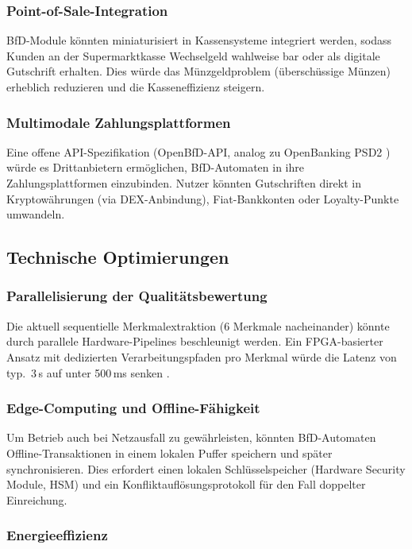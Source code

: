 ﻿\documentclass[a4paper,12pt]{article}
\theoremstyle{definition}
\begin{document}
\subsubsection{Point-of-Sale-Integration}

BfD-Module könnten miniaturisiert in Kassensysteme integriert werden,
sodass Kunden an der Supermarktkasse Wechselgeld wahlweise bar oder als
digitale Gutschrift erhalten.  Dies würde das Münzgeldproblem (überschüssige
Münzen) erheblich reduzieren und die Kasseneffizienz steigern.

\subsubsection{Multimodale Zahlungsplattformen}

Eine offene API-Spezifikation (OpenBfD-API, analog zu OpenBanking PSD2 \cite{psd2})
würde es Drittanbietern ermöglichen, BfD-Automaten in ihre Zahlungsplattformen
einzubinden.  Nutzer könnten Gutschriften direkt in Kryptowährungen
(via DEX-Anbindung), Fiat-Bankkonten oder Loyalty-Punkte umwandeln.

\subsection{Technische Optimierungen}

\subsubsection{Parallelisierung der Qualitätsbewertung}

Die aktuell sequentielle Merkmalextraktion (6 Merkmale nacheinander) könnte
durch parallele Hardware-Pipelines beschleunigt werden.  Ein FPGA-basierter
Ansatz mit dedizierten Verarbeitungspfaden pro Merkmal würde die Latenz
von typ.\ 3\,s auf unter 500\,ms senken \cite{kuon2006measuring}.

\subsubsection{Edge-Computing und Offline-Fähigkeit}

Um Betrieb auch bei Netzausfall zu gewährleisten, könnten BfD-Automaten
Offline-Transaktionen in einem lokalen Puffer speichern und später
synchronisieren.  Dies erfordert einen lokalen Schlüsselspeicher (Hardware
Security Module, HSM) und ein Konfliktauflösungsprotokoll für den Fall
doppelter Einreichung.

\subsubsection{Energieeffizienz}
\end{document}
